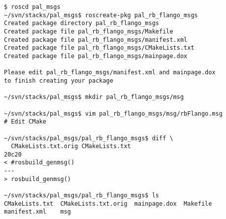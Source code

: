 \begin{lstlisting}[caption=Creation of a ROS Message, label=impl-ros-create-message]
$ roscd pal_msgs
~/svn/stacks/pal_msgs$ roscreate-pkg pal_rb_flango_msgs
Created package directory pal_rb_flango_msgs
Created package file pal_rb_flango_msgs/Makefile
Created package file pal_rb_flango_msgs/manifest.xml
Created package file pal_rb_flango_msgs/CMakeLists.txt
Created package file pal_rb_flango_msgs/mainpage.dox

Please edit pal_rb_flango_msgs/manifest.xml and mainpage.dox 
to finish creating your package

~/svn/stacks/pal_msgs$ mkdir pal_rb_flango_msgs/msg

~/svn/stacks/pal_msgs$ vim pal_rb_flango_msgs/msg/rbFlango.msg
# Edit CMake

~/svn/stacks/pal_msgs/pal_rb_flango_msgs$ diff \
  CMakeLists.txt.orig CMakeLists.txt
20c20
< #rosbuild_genmsg()
---
> rosbuild_genmsg()

~/svn/stacks/pal_msgs/pal_rb_flango_msgs$ ls
CMakeLists.txt  CMakeLists.txt.orig  mainpage.dox  Makefile  
manifest.xml    msg


\end{lstlisting}
